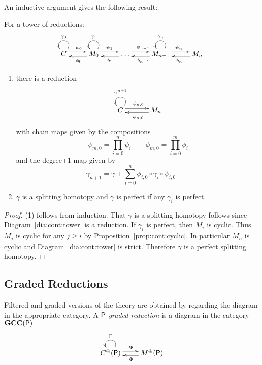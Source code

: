 An inductive argument gives the following result:


\begin{prop}\label{prop:cont:tower}
For a tower of reductions:
\[
\xymatrixrowsep{0.03in}
\xymatrixcolsep{0.35in}
\xymatrix{
C   \ar@(ur,ul)_{\gamma_0} \ar[r]<3pt>^{\psi_0} & \ar[l]<3pt>^{\phi_0 } M_0 \ar@(ur,ul)_{\gamma_1} \ar[r]<3pt>^{\psi_1} & \ar[l]<3pt>^{\phi_1 }  \ldots \ar[r]<3pt>^{\psi_{n-1}}  & \ar[l]<3pt>^{\phi_{n-1} }M_{n-1} \ar@(ur,ul)_{\gamma_n}  \ar[r]<3pt>^{\psi_n} & \ar[l]<3pt>^{\phi_n} M_n
}
\]

\begin{enumerate}
\item there is a reduction 
\begin{align}\label{dia:cont:tower}
\xymatrixrowsep{0.03in}
\xymatrixcolsep{0.45in}
\xymatrix{
 C \ar@(ur,ul)_{\gamma^{n+1} } \ar[r]<3pt>^{\psi_{n,0}} & \ar[l]<3pt>^{\phi_{n,0}} M_n
}
\end{align}
with chain maps given by the compositions
\[
 \psi_{m,0} = \prod_{i=0}^n \psi_i \quad\quad \phi_{m,0} = \prod_{i=0}^m \phi_i 
\]
and the degree+1 map given by
\[
\gamma_{n+1}= \gamma + \sum_{i=0}^n \phi_{i,0}\circ  \gamma_i\circ \psi_{i,0} \quad\quad 
\]
\item $\gamma$ is a splitting homotopy and $\gamma$ is perfect if any $\gamma_i$ is perfect.

\end{enumerate}
\end{prop}
\begin{proof}
(1) follows from induction.  That $\gamma$ is a splitting homotopy follows since Diagram~\ref{dia:cont:tower} is a reduction.  If $\gamma_i$ is perfect, then $M_i$ is cyclic.  Thus $M_j$ is cyclic for any $j\geq i$ by Proposition~\ref{prop:cont:cyclic}. In particular $M_n$ is cyclic and Diagram~\ref{dia:cont:tower} is strict.  Therefore $\gamma$ is a perfect splitting homotopy.
\end{proof}




\subsection{Graded Reductions}

Filtered and graded versions of the theory are obtained by regarding the diagram in the appropriate category.  A {\em ${\mathsf P}$-graded reduction} is a diagram in the category ${\bf GCC}({\mathsf P})$
 \[
\xymatrixrowsep{0.03in}
\xymatrixcolsep{0.3in}
\xymatrix{
C^\oplus(\sP)\ar@(ur,ul)_{\Gamma}  \ar[r]<3pt>^{\Psi} & \ar[l]<3pt>^{\Phi} M^\oplus(\sP) 
}
\]


